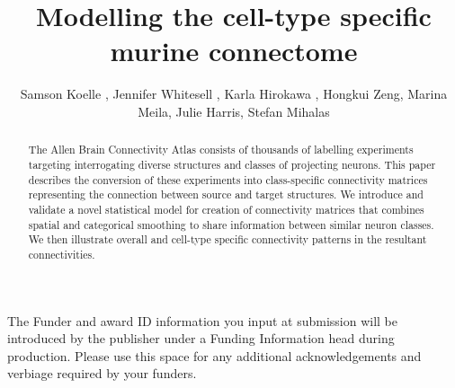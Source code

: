 \documentclass[NETN,manuscript]{stjour-new}
\begin{document}

\title{Modelling the cell-type specific murine connectome}

\author[Koelle et al]%
{Samson Koelle , Jennifer Whitesell , Karla Hirokawa ,  Hongkui Zeng, Marina Meila, Julie Harris, Stefan Mihalas}





\begin{abstract}

The Allen Brain Connectivity Atlas consists of thousands of labelling experiments targeting interrogating diverse structures and classes of projecting neurons.
This paper describes the conversion of these experiments into class-specific connectivity matrices representing the connection between source and target structures.
We introduce and validate a novel statistical model for creation of connectivity matrices that combines spatial and categorical smoothing to share information between similar neuron classes.
We then illustrate overall and cell-type specific connectivity patterns in the resultant connectivities.

\end{abstract}

\begin{authorsummary}
\end{authorsummary}







\acknowledgments
The Funder and award ID information you input at submission will be introduced by the publisher under a Funding Information head during production. 
Please use this space for any additional acknowledgements and verbiage required by your funders.
\end{document}
